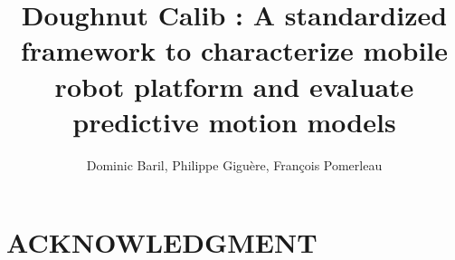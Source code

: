 \documentclass[letterpaper, 10 pt, conference]{ieeeconf}  %
\title{\LARGE \bf 
    Doughnut Calib : A standardized framework to characterize mobile robot platform and evaluate predictive motion models
}
\author{Dominic Baril, Philippe Giguère, François Pomerleau
}
\begin{document}
\maketitle
\thispagestyle{empty}
\pagestyle{empty}

\begin{abstract}

\lightlipsum[1-1]

\end{abstract}















\addtolength{\textheight}{-12cm}   %

\section*{ACKNOWLEDGMENT}

\printbibliography
\end{document}

